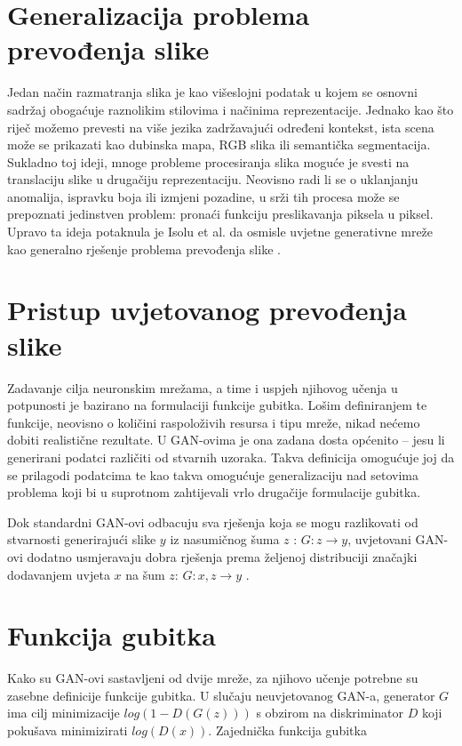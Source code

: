 \documentclass[lmodern, utf8, seminar]{fer}
\begin{document}
\section{Generalizacija problema prevođenja slike}
Jedan način razmatranja slika je kao višeslojni podatak u kojem se osnovni sadržaj obogaćuje raznolikim stilovima i načinima reprezentacije. 
Jednako kao što riječ možemo prevesti na više jezika zadržavajući određeni kontekst, ista scena može se prikazati kao dubinska mapa, RGB slika ili semantička segmentacija. Sukladno toj ideji, mnoge probleme procesiranja slika moguće je svesti na translaciju slike u drugačiju reprezentaciju. Neovisno radi li se o uklanjanju anomalija, ispravku boja ili izmjeni pozadine, u srži tih procesa može se prepoznati jedinstven problem: pronaći funkciju preslikavanja piksela u piksel. Upravo ta ideja potaknula je Isolu et al. da osmisle uvjetne generativne mreže kao generalno rješenje problema prevođenja slike \cite{isola2017image}.
\newline

\section{Pristup uvjetovanog prevođenja slike}
Zadavanje cilja neuronskim mrežama, a time i uspjeh njihovog učenja u potpunosti je bazirano na formulaciji funkcije gubitka. Lošim definiranjem te funkcije, neovisno o količini raspoloživih resursa i tipu mreže, nikad nećemo dobiti realistične rezultate. U GAN-ovima je ona zadana dosta općenito -- jesu li generirani podatci različiti od stvarnih uzoraka. Takva definicija omogućuje joj da se prilagodi podatcima te kao takva omogućuje generalizaciju nad setovima problema koji bi u suprotnom zahtijevali vrlo drugačije formulacije gubitka. 

Dok standardni GAN-ovi odbacuju sva rješenja koja se mogu razlikovati od stvarnosti generirajući slike $y$ iz nasumičnog šuma $z$ : $G: z \rightarrow y$, uvjetovani GAN-ovi dodatno usmjeravaju dobra rješenja prema željenoj distribuciji značajki dodavanjem uvjeta $x$ na šum $z$: $G: {x,z} \rightarrow y$ \cite{isola2017image}.

\newpage
\section{Funkcija gubitka}
Kako su GAN-ovi sastavljeni od dvije mreže, za njihovo učenje potrebne su zasebne definicije funkcije gubitka. U slučaju neuvjetovanog GAN-a, generator $G$ ima cilj minimizacije $log(1 - D(G(z)))$ s obzirom na diskriminator $D$ koji pokušava minimizirati $log(D(x))$.
Zajednička funkcija gubitka
\end{document}
